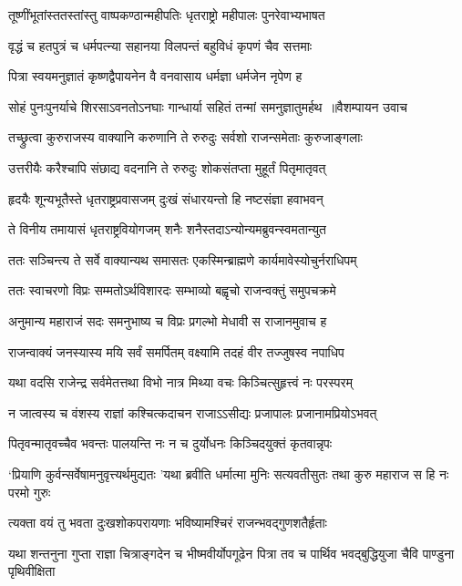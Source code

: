 \twolineshloka
{तूष्णींभूतांस्ततस्तांस्तु वाष्पकण्ठान्महीपतिः}
{धृतराष्ट्रो महीपालः पुनरेवाभ्यभाषत}


\twolineshloka
{वृद्धं च हतपुत्रं च धर्मपत्न्या सहानया}
{विलपन्तं बहुविधं कृपणं चैव सत्तमाः}


\twolineshloka
{पित्रा स्वयमनुज्ञातं कृष्णद्वैपायनेन वै}
{वनवासाय धर्मज्ञा धर्मजेन नृपेण ह}


\threelineshloka
{सोहं पुनःपुनर्याचे शिरसाऽवनतोऽनघाः}
{गान्धार्या सहितं तन्मां समनुज्ञातुमर्हथ ॥वैशम्पायन उवाच}
{}


\twolineshloka
{तच्छ्रुत्वा कुरुराजस्य वाक्यानि करुणानि ते}
{रुरुदुः सर्वशो राजन्समेताः कुरुजाङ्गलाः}


\twolineshloka
{उत्तरीयैः करैश्चापि संछाद्य वदनानि ते}
{रुरुदुः शोकसंतप्ता मुहूर्तं पितृमातृवत्}


\twolineshloka
{हृदयैः शून्यभूतैस्ते धृतराष्ट्रप्रवासजम्}
{दुःखं संधारयन्तो हि नष्टसंज्ञा हवाभवन्}


\twolineshloka
{ते विनीय तमायासं धृतराष्ट्रवियोगजम्}
{शनैः शनैस्तदाऽन्योन्यमब्रुवन्स्वमतान्युत}


\twolineshloka
{ततः सञ्चिन्त्य ते सर्वे वाक्यान्यथ समासतः}
{एकस्मिन्ब्राह्मणे कार्यमावेस्योचुर्नराधिपम्}


\twolineshloka
{ततः स्वाचरणो विप्रः सम्मतोऽर्थविशारदः}
{सम्भाव्यो बह्वृचो राजन्वक्तुं समुपचक्रमे}


\twolineshloka
{अनुमान्य महाराजं सदः समनुभाष्य च}
{विप्रः प्रगल्भो मेधावी स राजानमुवाच ह}


\twolineshloka
{राजन्वाक्यं जनस्यास्य मयि सर्वं समर्पितम्}
{वक्ष्यामि तदहं वीर तज्जुषस्व नपाधिप}


\twolineshloka
{यथा वदसि राजेन्द्र सर्वमेतत्तथा विभो}
{नात्र मिथ्या वचः किञ्चित्सुहृत्त्वं नः परस्परम्}


\twolineshloka
{न जात्वस्य च वंशस्य राज्ञां कश्चित्कदाचन}
{राजाऽऽसीद्यः प्रजापालः प्रजानामप्रियोऽभवत्}


\twolineshloka
{पितृवन्मातृवच्चैव भवन्तः पालयन्ति नः}
{न च दुर्योधनः किञ्चिदयुक्तं कृतवान्नृपः}


\threelineshloka
{`प्रियाणि कुर्वन्सर्वेषामनुवृत्त्यर्थमुद्यतः}
{'यथा ब्रवीति धर्मात्मा मुनिः सत्यवतीसुतः}
{तथा कुरु महाराज स हि नः परमो गुरुः}


\twolineshloka
{त्यक्ता वयं तु भवता दुःखशोकपरायणाः}
{भविष्यामश्चिरं राजन्भवद्गुणशतैर्हृताः}


\threelineshloka
{यथा शन्तनुना गुप्ता राज्ञा चित्राङ्गदेन च}
{भीष्मवीर्योपगूढेन पित्रा तव च पार्थिव}
{भवद्बुद्धियुजा चैवि पाण्डुना पृथिवीक्षिता}


